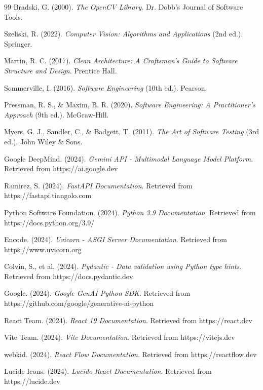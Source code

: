 \begin{thebibliography}{99}
Bradski, G. (2000). \textit{The OpenCV Library}. Dr. Dobb's Journal of Software Tools.

Szeliski, R. (2022). \textit{Computer Vision: Algorithms and Applications} (2nd ed.). Springer.

Martin, R. C. (2017). \textit{Clean Architecture: A Craftsman's Guide to Software Structure and Design}. Prentice Hall.

Sommerville, I. (2016). \textit{Software Engineering} (10th ed.). Pearson.

Pressman, R. S., \& Maxim, B. R. (2020). \textit{Software Engineering: A Practitioner's Approach} (9th ed.). McGraw-Hill.

Myers, G. J., Sandler, C., \& Badgett, T. (2011). \textit{The Art of Software Testing} (3rd ed.). John Wiley \& Sons.

Google DeepMind. (2024). \textit{Gemini API - Multimodal Language Model Platform}. Retrieved from https://ai.google.dev

Ramirez, S. (2024). \textit{FastAPI Documentation}. Retrieved from https://fastapi.tiangolo.com

Python Software Foundation. (2024). \textit{Python 3.9 Documentation}. Retrieved from https://docs.python.org/3.9/

Encode. (2024). \textit{Uvicorn - ASGI Server Documentation}. Retrieved from https://www.uvicorn.org

Colvin, S., et al. (2024). \textit{Pydantic - Data validation using Python type hints}. Retrieved from https://docs.pydantic.dev

Google. (2024). \textit{Google GenAI Python SDK}. Retrieved from https://github.com/google/generative-ai-python

React Team. (2024). \textit{React 19 Documentation}. Retrieved from https://react.dev

Vite Team. (2024). \textit{Vite Documentation}. Retrieved from https://vitejs.dev

webkid. (2024). \textit{React Flow Documentation}. Retrieved from https://reactflow.dev

Lucide Icons. (2024). \textit{Lucide React Documentation}. Retrieved from https://lucide.dev


\end{thebibliography}
